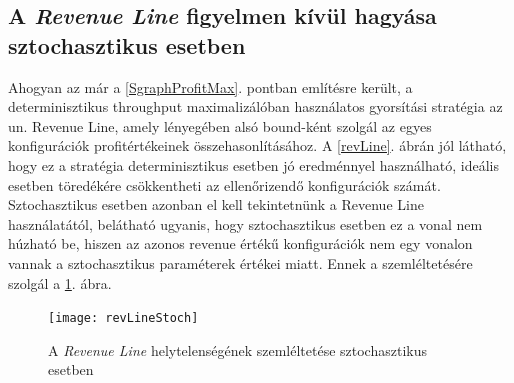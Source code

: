 \subsection{A \textit{Revenue Line} figyelmen kívül hagyása sztochasztikus esetben}
Ahogyan az már a \ref{SgraphProfitMax}. pontban említésre került, a determinisztikus throughput maximalizálóban használatos gyorsítási stratégia az un. Revenue Line, amely lényegében alsó bound-ként szolgál az egyes konfigurációk profitértékeinek összehasonlításához.
A \ref{revLine}. ábrán jól látható, hogy ez a stratégia determinisztikus esetben jó eredménnyel használható, ideális esetben töredékére csökkentheti az ellenőrizendő konfigurációk számát.
Sztochasztikus esetben azonban el kell tekintetnünk a Revenue Line használatától, belátható ugyanis, hogy sztochasztikus esetben ez a vonal nem húzható be, hiszen az azonos revenue értékű konfigurációk nem egy vonalon vannak a sztochasztikus paraméterek értékei miatt.
Ennek a szemléltetésére szolgál a \ref{revLineStoch}. ábra.
\begin{figure}[H]
\begin{center}
\texttt{[image: revLineStoch]}
\caption{A \textit{Revenue Line} helytelenségének szemléltetése sztochasztikus esetben}
\label{revLineStoch}
\end{center}
\end{figure} 
